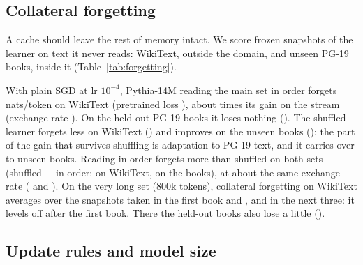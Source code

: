 \documentclass[10pt]{article}
\begin{document}
\subsection{Collateral forgetting}\label{sec:forgetting}

A cache should leave the rest of memory intact.
We score frozen snapshots of the learner on text it never reads: WikiText, outside the domain, and unseen PG-19 books, inside it (Table~\ref{tab:forgetting}).

With plain SGD at lr $10^{-4}$, Pythia-14M reading the main set in order forgets \forgetWikiKOnePM{} nats/token on WikiText (pretrained loss \frozenWiki{}), about \wikiOverGainKOne{} times its gain on the stream (exchange rate \exchangeKOne{}).
On the held-out PG-19 books it loses nothing (\forgetBooksKOnePM{}).
The shuffled learner forgets less on WikiText (\forgetWikiShuffledPM{}) and improves on the unseen books (\forgetBooksShuffledPM{}): the part of the gain that survives shuffling is adaptation to PG-19 text, and it carries over to unseen books.
Reading in order forgets more than shuffled on both sets (shuffled $-$ in order: \shMinusKOneWikiPM{} on WikiText, \shMinusKOneBooksPM{} on the books), at about the same exchange rate (\exchangeKOne{} and \exchangeShuffled{}).
On the very long set (800k tokens), collateral forgetting on WikiText averages \veryLongWikiBookOne{} over the snapshots taken in the first book and \veryLongWikiBookTwo{}, \veryLongWikiBookThree{} and \veryLongWikiBookFour{} in the next three: it levels off after the first book.
There the held-out books also lose a little (\forgetBooksVeryLongPM{}).

\begin{table}[t]
\centering\footnotesize\setlength{\tabcolsep}{3.5pt}

\caption{Collateral forgetting of held-out text by Pythia-14M with plain SGD on all parameters (lr $10^{-4}$): snapshot loss $-$ pretrained loss, mean over the snapshots in the second half of the stream, $\pm$ SE over the WikiText chunks or the 6 held-out books; positive means knowledge lost. Stream gain: over the frozen loss on the stream, $\pm$ SE over books. Exchange rate = stream gain / collateral forgetting on WikiText. $\dagger$: under 2 SE.}
\label{tab:forgetting}
\end{table}

\subsection{Update rules and model size}\label{sec:rules}
\end{document}
